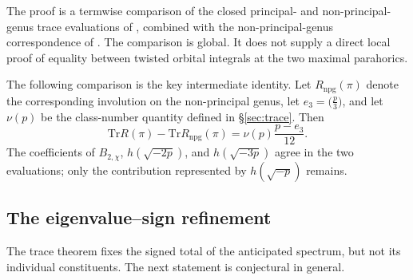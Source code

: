 \documentclass[10pt,a4paper]{amsart}
\newcommand{\Tr}{\mathrm{Tr}}
\begin{document}
	The proof is a termwise comparison of the closed principal- and
	non-principal-genus trace evaluations of
	\cite{IbukiyamaKatsura,Ibukiyama2019quinary}, combined with the
	non-principal-genus correspondence of \cite{DPRT,Ibukiyama-dim}. The
	comparison is global. It does not supply a direct local proof of equality
	between twisted orbital integrals at the two maximal parahorics.
	
	The following comparison is the key intermediate identity. Let
	$R_{\mathrm{npg}}(\pi)$ denote the corresponding involution on the
	non-principal genus, let $e_3=\bigl(\frac p3\bigr)$, and let $\nu(p)$ be
	the class-number quantity defined in \S\ref{sec:trace}. Then
	\begin{equation}\label{eq:genus-comparison}
		\Tr R(\pi)-\Tr R_{\mathrm{npg}}(\pi)
		=\nu(p)\frac{p-e_3}{12}.
	\end{equation}
	The coefficients of $B_{2,\chi}$, $h(\sqrt{-2p})$, and $h(\sqrt{-3p})$
	agree in the two evaluations; only the contribution represented by
	$h(\sqrt{-p})$ remains.
	
	\subsection{The eigenvalue--sign refinement}
	
	The trace theorem fixes the signed total of the anticipated spectrum, but
	not its individual constituents. The next statement is conjectural in
	general.
	
\end{document}

